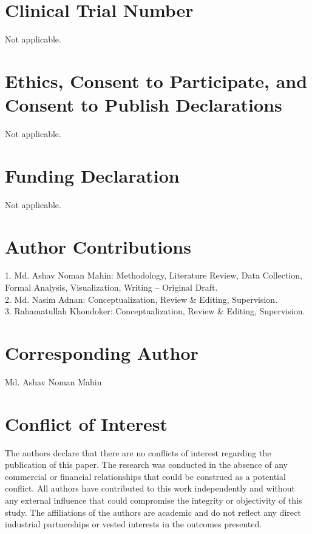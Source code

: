 \documentclass[conference]{IEEEtran}
\begin{document}
\section*{Clinical Trial Number}
Not applicable.

\section*{Ethics, Consent to Participate, and Consent to Publish Declarations}
Not applicable. 

\section*{Funding Declaration}
Not applicable. 

\section*{Author Contributions}
1. Md. Ashav Noman Mahin: Methodology, Literature Review, Data Collection, Formal Analysis, Visualization, Writing – Original Draft.\\
2. Md. Nasim Adnan: Conceptualization, Review \& Editing, Supervision. \\
3. Rahamatullah Khondoker: Conceptualization, Review \& Editing, Supervision. \\

\section*{Corresponding Author}
Md. Ashav Noman Mahin

\section*{Conflict of Interest}
The authors declare that there are no conflicts of interest regarding the publication of this paper. The research was conducted in the absence of any commercial or financial relationships that could be construed as a potential conflict. All authors have contributed to this work independently and without any external influence that could compromise the integrity or objectivity of this study. The affiliations of the authors are academic and do not reflect any direct industrial partnerships or vested interests in the outcomes presented.
\end{document}
